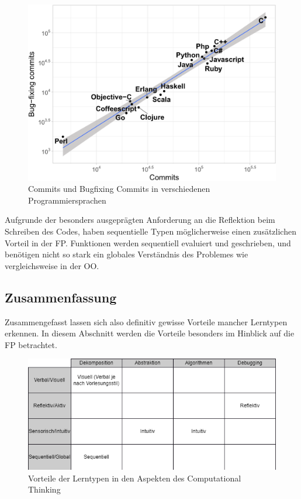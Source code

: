 \begin{figure}[H]
    \centering
    \includegraphics[width=1\linewidth]{Figures/Section_3/FigBugCommitsFP}
    \caption{Commits und Bugfixing Commits in verschiedenen Programmiersprachen \protect\cite{berger}}
\end{figure}

Aufgrunde der besonders ausgeprägten Anforderung an die Reflektion beim Schreiben des Codes, haben sequentielle Typen möglicherweise einen zusätzlichen Vorteil in der FP. Funktionen werden sequentiell evaluiert und geschrieben, und benötigen nicht so stark ein globales Verständnis des Problemes wie vergleichsweise in der OO.

\subsection{Zusammenfassung}
Zusammengefasst lassen sich also definitiv gewisse Vorteile mancher Lerntypen erkennen. In diesem Abschnitt werden die Vorteile besonders im Hinblick auf die FP betrachtet.

\begin{figure}[H]
    \centering
    \includegraphics[width=1\linewidth]{Figures/Section_3/Styles_CT}
    \caption{Vorteile der Lerntypen in den Aspekten des Computational Thinking}
\end{figure}

